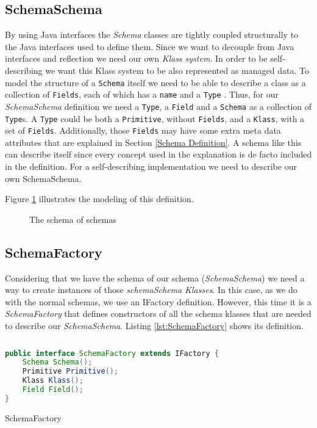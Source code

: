 \subsection{SchemaSchema}\label{sec:SchemaSchema}
By using Java interfaces the \textit{Schema} classes are tightly coupled structurally to the Java interfaces used to define them.
Since we want to decouple from Java interfaces and reflection we need our own \textit{Klass system}.
In order to be self-describing we want this Klass system to be also represented as managed data. 
To model the structure of a \texttt{Schema} itself we need to be able to describe a class as a collection of \texttt{Fields}, each of which has a \texttt{name} and a \texttt{Type} \cite{loh2012managed}. 
Thus, for our \textit{SchemaSchema} definition we need a \texttt{Type}, a \texttt{Field} and a \texttt{Schema} as a collection of \texttt{Type}s. 
A \texttt{Type} could be both a \texttt{Primitive}, without \texttt{Fields}, and a \texttt{Klass}, with a set of \texttt{Fields}.
Additionally, those \texttt{Fields} may have some extra meta data attributes that are explained in Section \ref{Schema Definition}.
A schema like this can describe itself since every concept used in the explanation is de facto included in the definition.
For a self-describing implementation we need to describe our own SchemaSchema. 

Figure \ref{fig:SchemaSchema_definition} illustrates the modeling of this definition.

\begin{figure}[H]
	\centering
  	\caption{The schema of schemas}
  	\label{fig:SchemaSchema_definition}
\end{figure}

\subsection{SchemaFactory}\label{sec:SchemaFactory}
Considering that we have the schema of our schema (\textit{SchemaSchema}) we need a way to create instances of those \textit{schemaSchema Klasses}.
In this case, as we do with the normal schemas, we use an IFactory definition.
However, this time it is a \textit{SchemaFactory} that defines constructors of all the schema klasses that are needed to describe our \textit{SchemaSchema}.
Listing \ref{lst:SchemaFactory} shows its definition.

\begin{sourcecode} [H]
	\begin{lstlisting}[language=Java, escapechar=|]
public interface SchemaFactory extends IFactory {
    Schema Schema();
    Primitive Primitive();
    Klass Klass();
    Field Field();
}
	\end{lstlisting}
	\caption{SchemaFactory}
	\label{lst:SchemaFactory}
\end{sourcecode}

